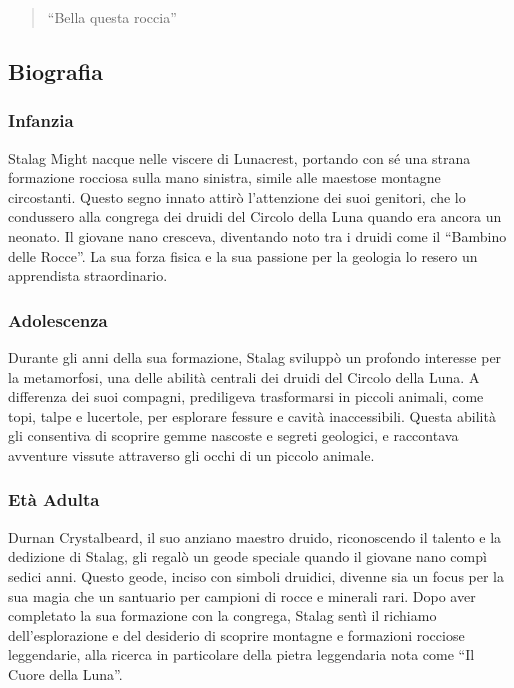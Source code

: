 \begin{quote}
``Bella questa roccia''
\end{quote}

\subsection{Biografia}\label{biografia}


\subsubsection{Infanzia}\label{infanzia}


Stalag Might nacque nelle viscere di Lunacrest, portando con sé una
strana formazione rocciosa sulla mano sinistra, simile alle maestose
montagne circostanti. Questo segno innato attirò l'attenzione dei suoi
genitori, che lo condussero alla congrega dei druidi del Circolo della
Luna quando era ancora un neonato. Il giovane nano cresceva, diventando
noto tra i druidi come il ``Bambino delle Rocce''. La sua forza fisica e
la sua passione per la geologia lo resero un apprendista straordinario.

\subsubsection{Adolescenza}\label{adolescenza}


Durante gli anni della sua formazione, Stalag sviluppò un profondo
interesse per la metamorfosi, una delle abilità centrali dei druidi del
Circolo della Luna. A differenza dei suoi compagni, prediligeva
trasformarsi in piccoli animali, come topi, talpe e lucertole, per
esplorare fessure e cavità inaccessibili. Questa abilità gli consentiva
di scoprire gemme nascoste e segreti geologici, e raccontava avventure
vissute attraverso gli occhi di un piccolo animale.

\subsubsection{Età Adulta}\label{etuxe0-adulta}


Durnan Crystalbeard, il suo anziano maestro druido, riconoscendo il
talento e la dedizione di Stalag, gli regalò un geode speciale quando il
giovane nano compì sedici anni. Questo geode, inciso con simboli
druidici, divenne sia un focus per la sua magia che un santuario per
campioni di rocce e minerali rari. Dopo aver completato la sua
formazione con la congrega, Stalag sentì il richiamo dell'esplorazione e
del desiderio di scoprire montagne e formazioni rocciose leggendarie,
alla ricerca in particolare della pietra leggendaria nota come ``Il
Cuore della Luna''.

